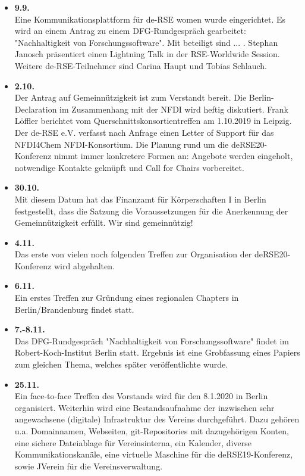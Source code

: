 \begin{itemize}
 \item \textbf{9.9.}\\
 Eine Kommunikationsplattform für de-RSE women wurde eingerichtet. Es wird an einem Antrag zu einem DFG-Rundgespräch gearbeitet: "Nachhaltigkeit von Forschungssoftware". Mit beteiligt sind ... . Stephan Janosch präsentiert einen Lightning Talk in der RSE-Worldwide Session. Weitere de-RSE-Teilnehmer sind Carina Haupt und Tobias Schlauch.
 \item \textbf{2.10.}\\
 Der Antrag auf Gemeinnützigkeit ist zum Verstandt bereit. Die Berlin-Declaration im Zusammenhang mit der NFDI wird heftig diskutiert. Frank Löffler berichtet vom Querschnittskonsortientreffen am 1.10.2019 in Leipzig. Der de-RSE e.V. verfasst nach Anfrage einen Letter of Support für das NFDI4Chem NFDI-Konsortium. Die Planung rund um die deRSE20-Konferenz nimmt immer konkretere Formen an: Angebote werden eingeholt, notwendige Kontakte geknüpft und Call for Chairs vorbereitet.

 \item \textbf{30.10.}\\
 Mit diesem Datum hat das Finanzamt für Körperschaften I in Berlin festgestellt, dass die Satzung die Voraussetzungen für die Anerkennung der Gemeinnützigkeit erfüllt. Wir sind gemeinnützig!

 \item \textbf{4.11.}\\
 Das erste von vielen noch folgenden Treffen zur Organisation der deRSE20-Konferenz wird abgehalten.

 \item \textbf{6.11.}\\
 Ein erstes Treffen zur Gründung eines regionalen Chapters in Berlin/Brandenburg findet statt.

 \item \textbf{7.-8.11.}\\
 Das DFG-Rundgespräch "Nachhaltigkeit von Forschungssoftware" findet im Robert-Koch-Institut Berlin statt. Ergebnis ist eine Grobfassung eines Papiers zum gleichen Thema, welches später veröffentlichte wurde.

 \item \textbf{25.11.}\\
 Ein face-to-face Treffen des Vorstands wird für den 8.1.2020 in Berlin organisiert. Weiterhin wird eine Bestandsaufnahme der inzwischen sehr angewachsene (digitale) Infrastruktur des Vereins durchgeführt. Dazu gehören u.a. Domainnamen, Webseiten, git-Repositories mit dazugehörigen Konten, eine sichere Dateiablage für Vereinsinterna, ein Kalender, diverse Kommunikationskanäle, eine virtuelle Maschine für die deRSE19-Konferenz, sowie JVerein für die Vereinsverwaltung.


\end{itemize}
